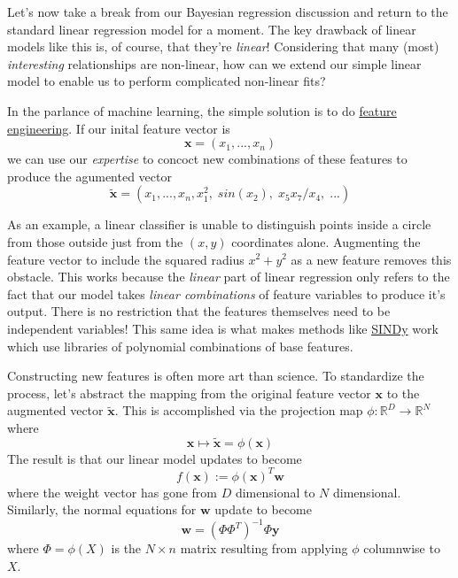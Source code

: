 Let's now take a break from our Bayesian regression discussion and return to the standard linear regression model for a moment. The key drawback of linear models like this is, of course, that they're \textit{linear}! Considering that many (most) \textit{interesting} relationships are non-linear, how can we extend our simple linear model to enable us to perform complicated non-linear fits?

In the parlance of machine learning, the simple solution is to do \href{https://en.wikipedia.org/wiki/Feature_engineering}{feature engineering}. If our inital feature vector is
\begin{equation}
    \mathbf{x} = (x_1, ..., x_n)
\end{equation}
we can use our \textit{expertise} to concoct new combinations of these features to produce the agumented vector
\begin{equation}
    \tilde{\mathbf{x}} = (x_1, ..., x_n, x_1^2, \;sin(x_2), \;x_5x_7/x_4,\;...)
\end{equation}

As an example, a linear classifier is unable to distinguish points inside a circle from those outside just from the $(x,y)$ coordinates alone. Augmenting the feature vector to include the squared radius $x^2+y^2$ as a new feature removes this obstacle. This works because the \textit{linear} part of linear regression only refers to the fact that our model takes \textit{linear combinations} of feature variables to produce it's output. There is no restriction that the features themselves need to be independent variables! This same idea is what makes methods like \href{https://www.pnas.org/doi/10.1073/pnas.1517384113}{SINDy} work which use libraries of polynomial combinations of base features.

Constructing new features is often more art than science. To standardize the process, let's abstract the mapping from the original feature vector $\mathbf{x}$ to the augmented vector $\tilde{\mathbf{x}}$. This is accomplished via the projection map $\phi:\mathbb{R}^D \to \mathbb{R}^N$ where
\begin{equation}
    \mathbf{x} \mapsto \tilde{\mathbf{x}} = \phi(\mathbf{x})
\end{equation}
The result is that our linear model updates to become
\begin{equation}
    f(\mathbf{x}) := \phi(\mathbf{x})^T\mathbf{w}
\end{equation}
where the weight vector has gone from $D$ dimensional to $N$ dimensional. Similarly, the normal equations for $\mathbf{w}$ update to become
\begin{equation}
    \mathbf{w} = (\Phi\Phi^T)^{-1}\Phi\mathbf{y}
\end{equation}
where $\Phi = \phi(X)$ is the $N\times n$ matrix resulting from applying $\phi$ columnwise to $X$.


